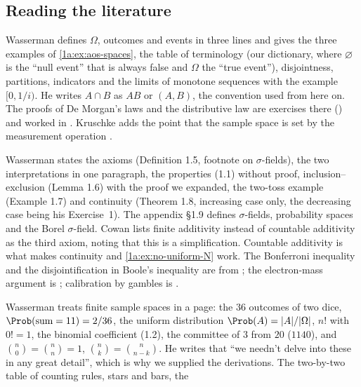 \subsection*{Reading the literature}
\begin{description}[leftmargin=1.5em,itemsep=2pt]
  \item[Events.]  Wasserman defines $\Omega$, outcomes and events in three lines and gives the
three examples of \cref{1a:ex:aos-spaces}, the table of terminology
(our dictionary, where $\varnothing$ is the ``null event'' that is always false
and $\Omega$ the ``true event''), disjointness, partitions, indicators and the
limits of monotone sequences with the example $[0,1/i)$. He writes $A\cap B$ as
$AB$ or $(A,B)$, the convention used from here on. The proofs of De Morgan's
laws and the distributive law are exercises there () and
worked in . Kruschke adds the point that the
sample space is set by the measurement operation .
  \item[Axioms.]  Wasserman states the axioms (Definition 1.5, footnote on $\sigma$-fields), the
two interpretations in one paragraph, the properties (1.1) without proof,
inclusion--exclusion (Lemma 1.6) with the proof we expanded, the two-toss
example (Example 1.7) and continuity (Theorem 1.8, increasing case only, the
decreasing case being his Exercise~1). The appendix \S1.9 defines $\sigma$-fields,
probability spaces and the Borel $\sigma$-field. Cowan  lists
finite additivity instead of countable additivity as the third axiom, noting
that this is a simplification. Countable additivity is what makes continuity
and \cref{1a:ex:no-uniform-N} work. The Bonferroni inequality and the
disjointification in Boole's inequality are from ;
the electron-mass argument is ; calibration by gambles is
.
  \item[Counting.]  Wasserman treats finite sample spaces in a page: the $36$ outcomes of two dice,
$\Prob(\text{sum}=11)=2/36$, the uniform distribution $\Prob(A)=|A|/|\Omega|$,
$n!$ with $0!=1$, the binomial coefficient (1.2), the committee of $3$ from $20$
($1140$), and $\binom n0=\binom nn=1$, $\binom nk=\binom n{n-k}$. He writes that
``we needn't delve into these in any great detail'', which is why we supplied
the derivations. The two-by-two table of counting rules, stars and bars, the

\end{description}
